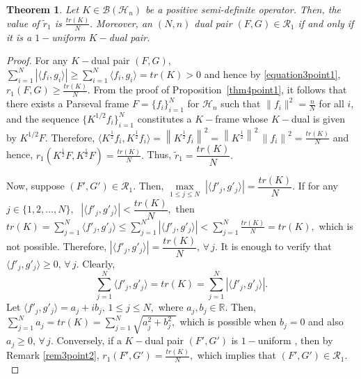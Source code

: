 \documentclass[final,1p,times]{elsarticle}
\newtheorem{thm}{Theorem}[section]
\begin{document}
	\begin{thm} \label{thm5point2}
   Let $K \in \mathcal{B}(\mathcal{H}_n)$ be a positive semi-definite operator. Then, the value of $\tilde{r}_{1} $ is $\frac{tr(K)}{N}.$  Moreover, an $(N,n)$ dual pair $(F,G) \in \mathcal{R}_{1} $ if and only if it is a $1-$uniform $K-$dual pair.
		
	\end{thm}
	\begin{proof}
		For any $K-$dual pair $(F,G),$ $\sum\limits_{i=1}^N \left|\langle f_i, g_i \rangle \right| \geq \sum\limits_{i=1}^N \langle f_i, g_i \rangle = tr(K) >0  $ and hence by \eqref{equation3point1}, $r_{1}(F,G) \geq \frac{tr(K)}{N}.$ From the proof of Proposition~\ref{thm4point1}, it follows that there exists a Parseval frame \( F = \{f_i\}_{i=1}^N \) for \( \mathcal{H}_n \) such that \( \|f_i\|^2 = \frac{n}{N} \) for all \( i \), and the sequence \( \{K^{1/2} f_i\}_{i=1}^N \) constitutes a \( K-\)frame whose \( K-\)dual is given by \( K^{1/2} F \). Therefore,
		$\langle K^{\frac{1}{2}}f_i ,K^{\frac{1}{2}}f_i \rangle = \left\| K^{\frac{1}{2}} f_i \right\|^2 = \left\| K^\frac{1}{2} \right\|^2 \,\left\| f_i \right\|^2  = \frac{tr(K)}{N}$ and hence, $r_{1}\left(K^{\frac{1}{2}}F,K^{\frac{1}{2}} F \right) = \frac{tr(K)}{N}.$ Thus, $\tilde{r}_{1} = \dfrac{tr(K)}{N}.$
		
		\par Now, suppose $(F',G') \in \mathcal{R}_{1}.$ Then, $\max\limits_{1 \leq j \leq N} \; |\langle f'_j , g'_j \rangle | = \dfrac{tr(K)}{N}.$ If for any $j \in \{1,2,\ldots,N\},\;$ \;$|\langle f'_j , g'_j \rangle | < \dfrac{tr(K)}{N},$ then  $ tr(K) = \displaystyle{\sum_{j=1}^N \langle f'_j , g'_j \rangle \leq \sum_{j=1}^N |\langle f'_j , g'_j \rangle | < \sum_{j=1}^N \frac{tr(K)}{N}} = tr(K)  ,$ which is not possible. Therefore, $|\langle f'_j, g'_j \rangle| =\dfrac{tr(K)}{N},\, \forall\, j.$ It is enough to verify that $\langle f'_j, g'_j \rangle \geq 0,\,\forall\, j.$ Clearly,
		$$\sum\limits_{j=1}^N \langle f'_j , g'_j \rangle =tr(K)= \sum\limits_{j=1}^N |\langle f'_j , g'_j \rangle | .$$
		Let $\langle f'_j , g'_j \rangle = a_j + ib_j,\, 1\leq j \leq N,$ where $a_j,b_j \in \mathbb{R}.$ Then, $\sum\limits_{j=1}^N a_j = tr(K) = \sum\limits_{j=1}^N \sqrt{a_j^2 +b_j^2,}$ which is possible when $b_j = 0$  and also $a_j \geq 0,\, \forall\, j.$ Conversely, if a $K-$dual pair $(F',G')$ is  $1-$uniform , then by Remark \ref{rem3point2}, $r_{1}(F',G') = \frac{tr(K)}{N},$ which implies that $(F',G') \in \mathcal{R}_{1}.$
		
	\end{proof}
	
\end{document}
